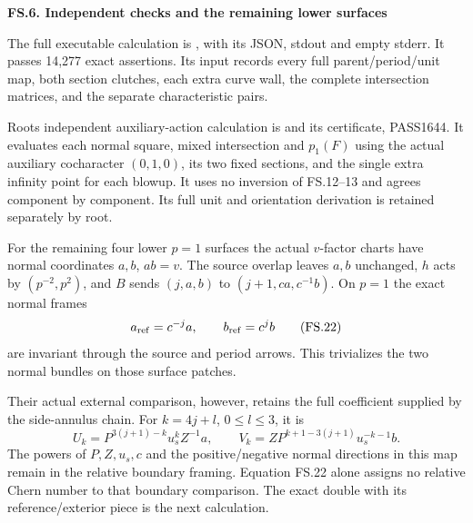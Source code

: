 \par

\medskip\noindent\textbf{FS.6. Independent checks and the remaining lower surfaces}

\par\nobreak

The full executable calculation is
,
with its JSON, stdout and empty stderr.
It passes 14,277 exact assertions.
Its input records every full
parent/period/unit map, both section
clutches, each extra curve wall,
the complete intersection matrices,
and the separate characteristic pairs.

Root\textquotesingle s independent auxiliary-action
calculation is
and its certificate, PASS1644.
It evaluates each normal square,
mixed intersection and \(p_1(F)\)
using the actual auxiliary
cocharacter \((0,1,0)\), its two
fixed sections, and the single
extra infinity point for each
blowup. It uses no inversion of
FS.12--13 and agrees component
by component. Its full unit
and orientation derivation is
retained separately by root.

For the remaining four lower
\(p=1\) surfaces the actual
\(v\)-factor charts have normal
coordinates \(a,b\), \(ab=v\).
The source overlap leaves \(a,b\)
unchanged, \(h\) acts by
\((p^{-2},p^2)\), and \(B\)
sends \((j,a,b)\) to
\((j+1,ca,c^{-1}b)\).
On \(p=1\) the exact normal
frames
\[
 a_{\rm ref}=c^{-j}a,\qquad b_{\rm ref}=c^j b             \tag{FS.22}
\]
are invariant through the
source and period arrows.
This trivializes the two
normal bundles on those
surface patches.

Their actual external comparison,
however, retains the full
coefficient supplied by the
side-annulus chain. For
\(k=4j+l\), \(0\le l\le3\),
it is
\[
 U_k=P^{3(j+1)-k}u_s^k Z^{-1}a,\qquad
 V_k=ZP^{k+1-3(j+1)}u_s^{-k-1}b.                          \tag{FS.23}
\]
The powers of \(P,Z,u_s,c\)
and the positive/negative
normal directions in this
map remain in the relative
boundary framing. Equation
FS.22 alone assigns no
relative Chern number to
that boundary comparison.
The exact double with its
reference/exterior piece is
the next calculation.

